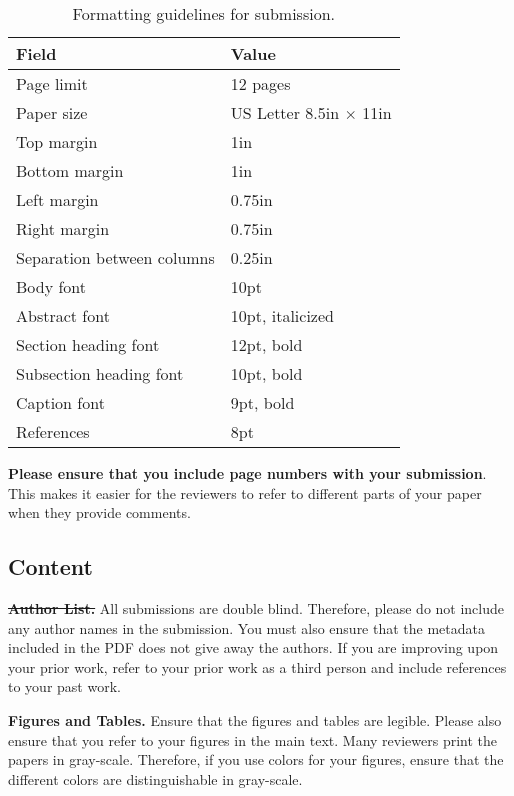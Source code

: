 \documentclass[pageno]{jpaper}
\begin{document}
\begin{table}[h!]
  \centering
  \begin{tabular}{|l|l|}
    \hline
    \textbf{Field} & \textbf{Value}\\
    \hline
    \hline
    Page limit & 12 pages\\
    \hline
    Paper size & US Letter 8.5in $\times$ 11in\\
    \hline
    Top margin & 1in\\
    \hline
    Bottom margin & 1in\\
    \hline
    Left margin & 0.75in\\
    \hline
    Right margin & 0.75in\\
    \hline
    Separation between columns & 0.25in\\
    \hline
    Body font & 10pt\\
    \hline
    Abstract font & 10pt, italicized\\
    \hline
    Section heading font & 12pt, bold\\
    \hline
    Subsection heading font & 10pt, bold\\
    \hline
    Caption font & 9pt, bold\\
    \hline
    References & 8pt\\
    \hline
  \end{tabular}
  \caption{Formatting guidelines for submission.}
  \label{table:formatting}
\end{table}

\textbf{Please ensure that you include page numbers with your
submission}. This makes it easier for the reviewers to refer to
different parts of your paper when they provide comments.

\subsection{Content}

\noindent\textbf{\sout{Author List.}} All submissions are double
blind. Therefore, please do not include any author names in the
submission. You must also ensure that the metadata included in the
PDF does not give away the authors. If you are improving upon your
prior work, refer to your prior work as a third person and include
references to your past work. 

\noindent\textbf{Figures and Tables.} Ensure that the figures and
tables are legible.  Please also ensure that you refer to your
figures in the main text. Many reviewers print the papers in
gray-scale. Therefore, if you use colors for your figures, ensure
that the different colors are distinguishable in gray-scale.
\end{document}
